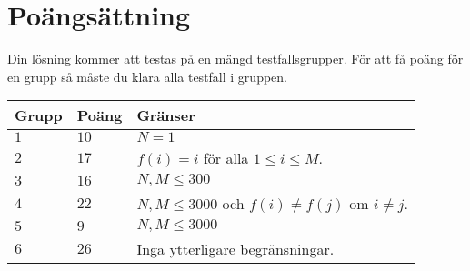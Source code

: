 \section*{Poängsättning}
Din lösning kommer att testas på en mängd testfallsgrupper.
För att få poäng för en grupp så måste du klara alla testfall i gruppen.

\noindent
\begin{tabular}{| l | l | p{12cm} |}
  \hline
  \textbf{Grupp} & \textbf{Poäng} & \textbf{Gränser} \\ \hline
  $1$    & $10$       & $N = 1$ \\ \hline
  $2$    & $17$       & $f(i) = i$ för alla $1 \leq i \leq M$. \\ \hline
  $3$    & $16$       & $N,M \leq 300$ \\ \hline
  $4$    & $22$       & $N,M \leq 3000$ och $f(i) \neq f(j)$ om $i \neq j$. \\ \hline
  $5$    & $9$        & $N,M \leq 3000$  \\ \hline
  $6$    & $26$       & Inga ytterligare begränsningar. \\ \hline
\end{tabular}


